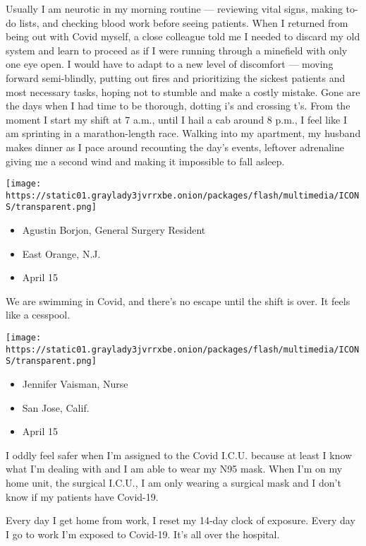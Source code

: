 Usually I am neurotic in my morning routine --- reviewing vital signs,
making to-do lists, and checking blood work before seeing patients. When
I returned from being out with Covid myself, a close colleague told me I
needed to discard my old system and learn to proceed as if I were
running through a minefield with only one eye open. I would have to
adapt to a new level of discomfort --- moving forward semi-blindly,
putting out fires and prioritizing the sickest patients and most
necessary tasks, hoping not to stumble and make a costly mistake. Gone
are the days when I had time to be thorough, dotting i's and crossing
t's. From the moment I start my shift at 7 a.m., until I hail a cab
around 8 p.m., I feel like I am sprinting in a marathon-length race.
Walking into my apartment, my husband makes dinner as I pace around
recounting the day's events, leftover adrenaline giving me a second wind
and making it impossible to fall asleep.

\texttt{[image: https://static01.graylady3jvrrxbe.onion/packages/flash/multimedia/ICONS/transparent.png]}

\begin{itemize}
\tightlist
\item
  Agustin Borjon, General Surgery Resident
\item
  East Orange, N.J.
\item
  April 15
\end{itemize}

We are swimming in Covid, and there's no escape until the shift is over.
It feels like a cesspool.

\texttt{[image: https://static01.graylady3jvrrxbe.onion/packages/flash/multimedia/ICONS/transparent.png]}

\begin{itemize}
\tightlist
\item
  Jennifer Vaisman, Nurse
\item
  San Jose, Calif.
\item
  April 15
\end{itemize}

I oddly feel safer when I'm assigned to the Covid I.C.U. because at
least I know what I'm dealing with and I am able to wear my N95 mask.
When I'm on my home unit, the surgical I.C.U., I am only wearing a
surgical mask and I don't know if my patients have Covid-19.

Every day I get home from work, I reset my 14-day clock of exposure.
Every day I go to work I'm exposed to Covid-19. It's all over the
hospital.

